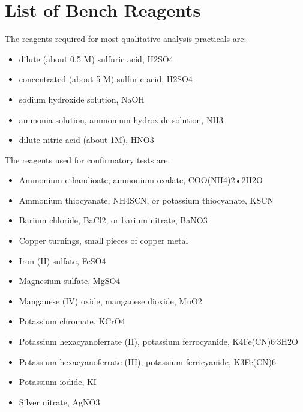 \section{List of Bench Reagents}

The reagents required for most qualitative analysis practicals are:
\begin{itemize}
\item{dilute (about 0.5 M) sulfuric acid, 
H2SO4}
\item{concentrated (about 5 M) sulfuric acid, 
H2SO4}
\item{sodium hydroxide solution, 
NaOH}
\item{ammonia solution, 
ammonium hydroxide solution, 
NH3}
\item{dilute nitric acid (about 1M), 
HNO3}
\end{itemize}

The reagents used for confirmatory tests are:
\begin{itemize}
\item{Ammonium ethandioate, 
ammonium oxalate, 
COO(NH4)2•2H2O}
\item{Ammonium thiocyanate, 
NH4SCN, 
or potassium thiocyanate, 
KSCN}
\item{Barium chloride, 
BaCl2, 
or barium nitrate, 
BaNO3}
\item{Copper turnings, 
small pieces of copper metal}
\item{Iron (II) sulfate, 
FeSO4}
\item{Magnesium sulfate, 
MgSO4}
\item{Manganese (IV) oxide, 
manganese dioxide, 
MnO2}
\item{Potassium chromate, 
KCrO4}
\item{Potassium hexacyanoferrate (II), 
potassium ferrocyanide, 
K4Fe(CN)6∙3H2O}
\item{Potassium hexacyanoferrate (III), 
potassium ferricyanide, 
K3Fe(CN)6}
\item{Potassium iodide, 
KI}
\item{Silver nitrate, 
AgNO3}
\end{itemize}

